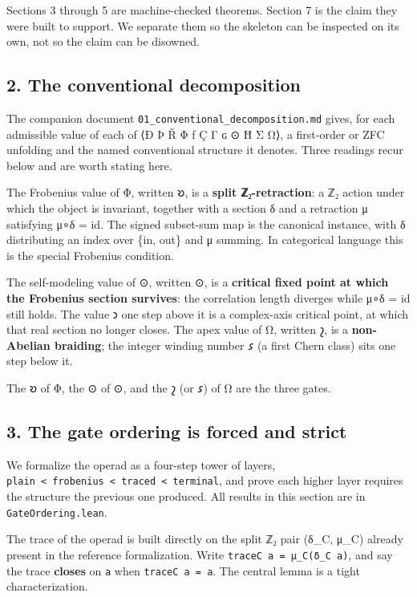 \documentclass[12pt,a4paper]{article}
\begin{document}
Sections 3 through 5 are machine-checked theorems. Section 7 is the
claim they were built to support. We separate them so the skeleton can
be inspected on its own, not so the claim can be disowned.

\hypertarget{the-conventional-decomposition}{%
\subsection{2. The conventional
decomposition}\label{the-conventional-decomposition}}

The companion document \texttt{01\_conventional\_decomposition.md}
gives, for each admissible value of each of ⟨Ð Þ Ř Φ ƒ Ç Γ ɢ ⊙ Ħ Σ Ω⟩, a
first-order or ZFC unfolding and the named conventional structure it
denotes. Three readings recur below and are worth stating here.

The Frobenius value of Φ, written 𐑹, is a \textbf{split ℤ₂-retraction}:
a ℤ₂ action under which the object is invariant, together with a section
δ and a retraction μ satisfying μ∘δ = id. The signed subset-sum map is
the canonical instance, with δ distributing an index over \{in, out\}
and μ summing. In categorical language this is the special Frobenius
condition.

The self-modeling value of ⊙, written ⊙, is a \textbf{critical fixed
point at which the Frobenius section survives}: the correlation length
diverges while μ∘δ = id still holds. The value 𐑮 one step above it is a
complex-axis critical point, at which that real section no longer
closes. The apex value of Ω, written 𐑟, is a \textbf{non-Abelian
braiding}; the integer winding number 𐑭 (a first Chern class) sits one
step below it.

The 𐑹 of Φ, the ⊙ of ⊙, and the 𐑟 (or 𐑭) of Ω are the three gates.

\hypertarget{the-gate-ordering-is-forced-and-strict}{%
\subsection{3. The gate ordering is forced and
strict}\label{the-gate-ordering-is-forced-and-strict}}

We formalize the operad as a four-step tower of layers,
\texttt{plain\ \textless{}\ frobenius\ \textless{}\ traced\ \textless{}\ terminal},
and prove each higher layer requires the structure the previous one
produced. All results in this section are in \texttt{GateOrdering.lean}.

The trace of the operad is built directly on the split ℤ₂ pair (δ\_C,
μ\_C) already present in the reference formalization. Write
\texttt{traceC\ a\ =\ μ\_C(δ\_C\ a)}, and say the trace \textbf{closes}
on \texttt{a} when \texttt{traceC\ a\ =\ a}. The central lemma is a
tight characterization.
\end{document}
